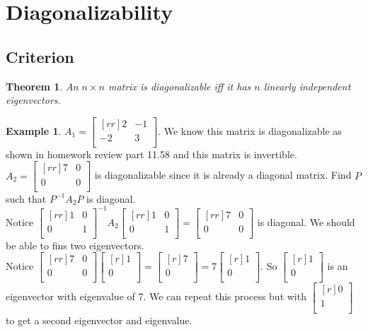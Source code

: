 \documentclass{report}
\theoremstyle{plain}
\newtheorem*{thrm}{Theorem}
\theoremstyle{definition}
\newtheorem*{ex}{Example}
\theoremstyle{plain}
\begin{document}
\section{Diagonalizability}
\subsection{Criterion}
\begin{thrm}
An $n\times n$ matrix is diagonalizable iff it has $n$ linearly independent eigenvectors.
\end{thrm}
\begin{ex}
$A_1=\begin{bmatrix}[rr]2&-1\\-2&3\\\end{bmatrix}$. We know this matrix is diagonalizable as shown in homework review part 11.58 and this matrix is invertible.
$A_2 = \begin{bmatrix}[rr]7&0\\0&0\\\end{bmatrix}$ is diagonalizable since it is already a diagonal matrix. Find $P$ such that $P^{-1}A_2P$ is diagonal.\\
Notice $\begin{bmatrix}[rr]1&0\\0&1\\\end{bmatrix}^{-1}A_2\begin{bmatrix}[rr]1&0\\0&1\\\end{bmatrix}=\begin{bmatrix}[rr]7&0\\0&0\\\end{bmatrix}$ is diagonal. We should be able to fins two eigenvectors.\\
Notice $\begin{bmatrix}[rr]7&0\\0&0\\\end{bmatrix}\begin{bmatrix}[r]1\\0\\\end{bmatrix}=\begin{bmatrix}[r]7\\0\\\end{bmatrix}=7\begin{bmatrix}[r]1\\0\\\end{bmatrix}$. So $\begin{bmatrix}[r]1\\0\\\end{bmatrix}$ is an eigenvector with eigenvalue of 7. We can repeat this process but with $\begin{bmatrix}[r]0\\1\\\end{bmatrix}$ to get a second eigenvector and eigenvalue.\\

\end{ex}
\end{document}
